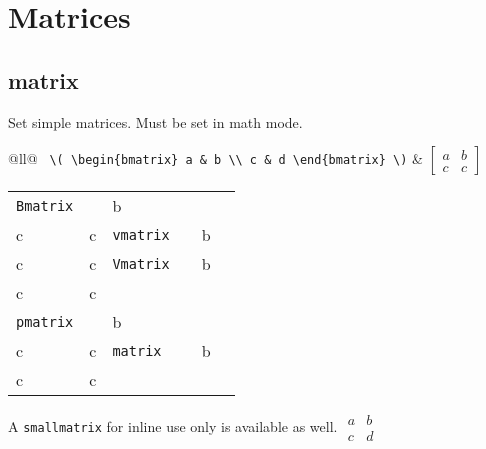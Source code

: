 \documentclass[draft]{../cheatsht/cheatsht}
\begin{document}
\section{Matrices}
\subsection{matrix}
Set simple matrices. Must be set in math mode.\\
\begin{tabular}{@{}ll@{}}
  \verb! \( \begin{bmatrix} a & b \\ c & d \end{bmatrix} \)!
    & \hspace{-4pt}\(\begin{bmatrix} a & b \\ c & c \end{bmatrix}\) \vspace{4pt}
\end{tabular}
\begin{tabular}{@{}llllll@{}}
  \verb!Bmatrix! & \(\begin{Bmatrix} a & b \\ c & c \end{Bmatrix}\) &
  \verb!vmatrix! & \(\begin{vmatrix} a & b \\ c & c \end{vmatrix}\) &
  \verb!Vmatrix! & \(\begin{Vmatrix} a & b \\ c & c \end{Vmatrix}\)
    \vspace{4pt}\\
  \verb!pmatrix! & \(\begin{pmatrix} a & b \\ c & c \end{pmatrix}\) &
  \verb!matrix! & \(\begin{matrix} a & b \\ c & c \end{matrix}\) \vspace{4pt}
\end{tabular}

A \verb!smallmatrix! for inline use only is available as well.
\(\begin{smallmatrix}a & b \\ c & d \end{smallmatrix}\)
\end{document}

